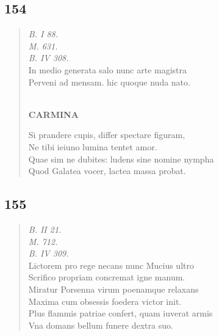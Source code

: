 \documentclass[11pt, a4paper]{report}
\begin{document}
            \subsection*{154}
      \begin{verse}
      \textit{B. I 88.} \\ \textit{M. 631.} \\ \textit{B. IV 308.} \\ In medio generata salo nunc arte magistra \\ Perveni ad mensam. hic quoque nuda nato. \\ 
        ﻿\pagebreak 
     \marginpar{[146]} \begin{center} \textbf{CARMINA} \end{center}Si prandere cupis, differ spectare figuram, \\ Ne tibi ieiuno lumina tentet amor. \\ Quae sim ne dubites: ludens sine nomine nympha \\ Quod Galatea vocer, lactea massa probat. \\ 
      \end{verse}
  
            \subsection*{155}
      \begin{verse}
      \textit{B. II 21.} \\ \textit{M. 712.} \\ \textit{B. IV 309.} \\ Lictorem pro rege necans nunc Mucius ultro \\ Scrifico propriam concremat igne manum. \\ Miratur Porsenna virum poenamque relaxans \\ Maxima cum obsessis foedera victor init. \\ Plus flammis patriae confert, quam iuverat armis \\ Vna domans bellum funere dextra suo. \\ 
      \end{verse}
  
\end{document}
